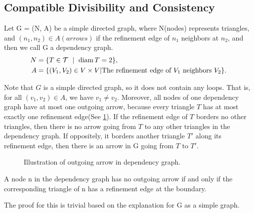     \subsection{Compatible Divisibility and Consistency}
    \begin{definition}
      Let G = (N, A) be a simple directed graph, where N(nodes) represents triangles, and $(n_1, n_2)\in A (arrows)$ if the refinement edge of $n_1$ neighbors at $n_2$, and then we call G a dependency graph.
      \begin{align*}
      N &= \{T\in\mathcal{T}~\mid~\operatorname{diam}{T} = 2\},\\
      A &= \{(V_1, V_2)\in V\times V | \text{The refinement edge of $V_1$ neighbors $V_2$}\}.
      \end{align*}
    \end{definition}
    Note that $G$ is a simple directed graph, so it does not contain any loops. That is, for all $(v_1, v_2)\in A$, we have $v_1\neq v_2$. Moreover, all nodes of one dependency graph have at most one outgoing arrow, because every triangle $T$ has at most exactly one refinement edge(See \ref{Fig9}). If the refinement edge of $T$ borders no other triangles, then there is no arrow going from $T$ to any other triangles in the dependency graph. If oppositely, it borders another triangle $T'$ along its refinement edge, then there is an arrow in G going from $T$ to $T'$.  %
    \begin{figure}[h!]
    \centering
    \caption{Illustration of outgoing arrow in dependency graph.}
    \label{Fig9}
    \end{figure}

    \begin{lemma}
    A node n in the dependency graph has no outgoing arrow if and only if the corresponding triangle of n has a refinement edge at the boundary.
    \label{lma7}
    \end{lemma}
    The proof for this is trivial based on the explanation for G as a simple graph.

